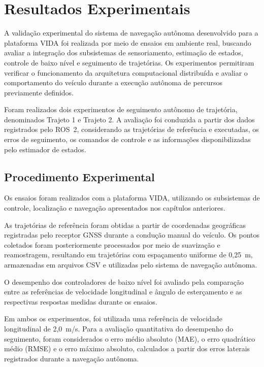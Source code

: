 \section{Resultados Experimentais}
\label{sec:resultados_experimentais}

A validação experimental do sistema de navegação autônoma desenvolvido para a plataforma VIDA foi realizada por meio de ensaios em ambiente real, buscando avaliar a integração dos subsistemas de sensoriamento, estimação de estados, controle de baixo nível e seguimento de trajetórias. Os experimentos permitiram verificar o funcionamento da arquitetura computacional distribuída e avaliar o comportamento do veículo durante a execução autônoma de percursos previamente definidos.

Foram realizados dois experimentos de seguimento autônomo de trajetória, denominados Trajeto 1 e Trajeto 2. A avaliação foi conduzida a partir dos dados registrados pelo ROS~2, considerando as trajetórias de referência e executadas, os erros de seguimento, os comandos de controle e as informações disponibilizadas pelo estimador de estados.

\subsection{Procedimento Experimental}
\label{subsec:procedimento_experimental}

Os ensaios foram realizados com a plataforma VIDA, utilizando os subsistemas de controle, localização e navegação apresentados nos capítulos anteriores.

As trajetórias de referência foram obtidas a partir de coordenadas geográficas registradas pelo receptor GNSS durante a condução manual do veículo. Os pontos coletados foram posteriormente processados por meio de suavização e reamostragem, resultando em trajetórias com espaçamento uniforme de 0,25~m, armazenadas em arquivos CSV e utilizadas pelo sistema de navegação autônoma.

O desempenho dos controladores de baixo nível foi avaliado pela comparação entre as referências de velocidade longitudinal e ângulo de esterçamento e as respectivas respostas medidas durante os ensaios.

Em ambos os experimentos, foi utilizada uma referência de velocidade longitudinal de 2,0~m/s. Para a avaliação quantitativa do desempenho do seguimento, foram considerados o erro médio absoluto (MAE), o erro quadrático médio (RMSE) e o erro máximo absoluto, calculados a partir dos erros laterais registrados durante a navegação autônoma.

